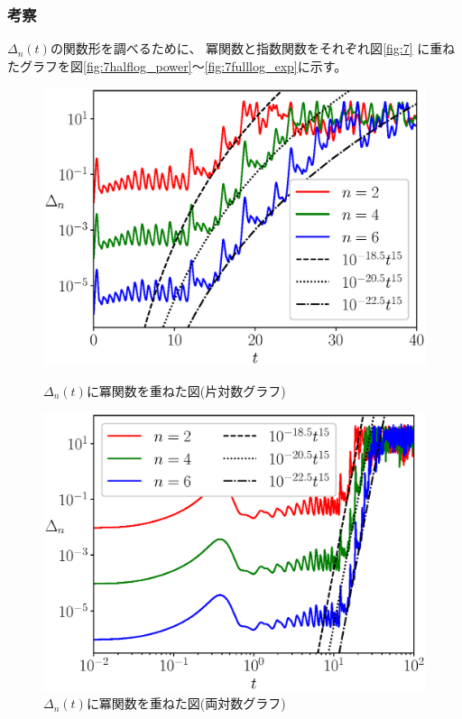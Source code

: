 \documentclass[a4j, titlepage]{jsarticle}
\numberwithin{equation}{section}
\begin{document}
        \subsubsection{考察}
            $\Delta_n(t)$の関数形を調べるために、
            冪関数と指数関数をそれぞれ図\ref{fig:7}
            に重ねたグラフを図\ref{fig:7halflog_power}〜\ref{fig:7fulllog_exp}に示す。
            \begin{figure}[h]
                \begin{minipage}{0.49\hsize}
                    \centering
                    \includegraphics[width=1\hsize]{kadai7/2halflog_power.eps}
                    \caption{
                        $\Delta_n(t)$に冪関数を重ねた図(片対数グラフ)
                    }
                    \label{fig:7halflog_power}
                \end{minipage}
                \begin{minipage}{0.49\hsize}
                    \centering
                    \includegraphics[width=1\hsize]{kadai7/2fulllog_power.eps}
                    \caption{
                        $\Delta_n(t)$に冪関数を重ねた図(両対数グラフ)
                    }
                    \label{fig:7fulllog_power}
                \end{minipage}
            \end{figure}
\end{document}
